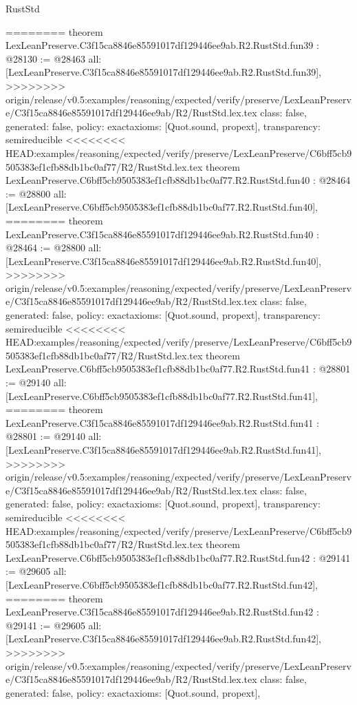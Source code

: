 \begin{lexlean}{RustStd}
\begin{coremodule}
{\begin{coremodule}
{{{{{{{{{{{{{{{{{{{{{{{{{{{{{{{{{{{{{{{{{{========
theorem LexLeanPreserve.C3f15ca8846e85591017df129446ee9ab.R2.RustStd.fun39 : @28130 := @28463 {
  all: [LexLeanPreserve.C3f15ca8846e85591017df129446ee9ab.R2.RustStd.fun39],
>>>>>>>> origin/release/v0.5:examples/reasoning/expected/verify/preserve/LexLeanPreserve/C3f15ca8846e85591017df129446ee9ab/R2/RustStd.lex.tex
  class: false,
  generated: false,
  policy: exact{axioms: [Quot.sound, propext]},
  transparency: semireducible
}
<<<<<<<< HEAD:examples/reasoning/expected/verify/preserve/LexLeanPreserve/C6bff5cb9505383ef1cfb88db1bc0af77/R2/RustStd.lex.tex
theorem LexLeanPreserve.C6bff5cb9505383ef1cfb88db1bc0af77.R2.RustStd.fun40 : @28464 := @28800 {
  all: [LexLeanPreserve.C6bff5cb9505383ef1cfb88db1bc0af77.R2.RustStd.fun40],
========
theorem LexLeanPreserve.C3f15ca8846e85591017df129446ee9ab.R2.RustStd.fun40 : @28464 := @28800 {
  all: [LexLeanPreserve.C3f15ca8846e85591017df129446ee9ab.R2.RustStd.fun40],
>>>>>>>> origin/release/v0.5:examples/reasoning/expected/verify/preserve/LexLeanPreserve/C3f15ca8846e85591017df129446ee9ab/R2/RustStd.lex.tex
  class: false,
  generated: false,
  policy: exact{axioms: [Quot.sound, propext]},
  transparency: semireducible
}
<<<<<<<< HEAD:examples/reasoning/expected/verify/preserve/LexLeanPreserve/C6bff5cb9505383ef1cfb88db1bc0af77/R2/RustStd.lex.tex
theorem LexLeanPreserve.C6bff5cb9505383ef1cfb88db1bc0af77.R2.RustStd.fun41 : @28801 := @29140 {
  all: [LexLeanPreserve.C6bff5cb9505383ef1cfb88db1bc0af77.R2.RustStd.fun41],
========
theorem LexLeanPreserve.C3f15ca8846e85591017df129446ee9ab.R2.RustStd.fun41 : @28801 := @29140 {
  all: [LexLeanPreserve.C3f15ca8846e85591017df129446ee9ab.R2.RustStd.fun41],
>>>>>>>> origin/release/v0.5:examples/reasoning/expected/verify/preserve/LexLeanPreserve/C3f15ca8846e85591017df129446ee9ab/R2/RustStd.lex.tex
  class: false,
  generated: false,
  policy: exact{axioms: [Quot.sound, propext]},
  transparency: semireducible
}
<<<<<<<< HEAD:examples/reasoning/expected/verify/preserve/LexLeanPreserve/C6bff5cb9505383ef1cfb88db1bc0af77/R2/RustStd.lex.tex
theorem LexLeanPreserve.C6bff5cb9505383ef1cfb88db1bc0af77.R2.RustStd.fun42 : @29141 := @29605 {
  all: [LexLeanPreserve.C6bff5cb9505383ef1cfb88db1bc0af77.R2.RustStd.fun42],
========
theorem LexLeanPreserve.C3f15ca8846e85591017df129446ee9ab.R2.RustStd.fun42 : @29141 := @29605 {
  all: [LexLeanPreserve.C3f15ca8846e85591017df129446ee9ab.R2.RustStd.fun42],
>>>>>>>> origin/release/v0.5:examples/reasoning/expected/verify/preserve/LexLeanPreserve/C3f15ca8846e85591017df129446ee9ab/R2/RustStd.lex.tex
  class: false,
  generated: false,
  policy: exact{axioms: [Quot.sound, propext]},
}}}}}}}}}}}}}}}}}}}}}}}}}}}}}}}}}}}}}}}}}}}}}}
\end{coremodule}}
\end{coremodule}
\end{lexlean}
